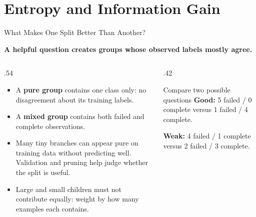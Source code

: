 \documentclass[aspectratio=169,10pt]{beamer}
\newcommand{\conceptlead}[1]{%
  {\normalsize\bfseries\color{CalPolyGreen}#1\par}%
}
\begin{document}
\section{Entropy and Information Gain}

\begin{frame}{What Makes One Split Better Than Another?}
\small
\conceptlead{A helpful question creates groups whose observed labels mostly agree.}
\begin{columns}[T,onlytextwidth]
 \begin{column}{.54\textwidth}
  \begin{itemize}
   \item A \textbf{pure group} contains one class only: no disagreement about its training labels.
   \item A \textbf{mixed group} contains both failed and complete observations.
   \item Many tiny branches can appear pure on training data without predicting well. Validation and pruning help judge whether the split is useful.
   \item Large and small children must not contribute equally: weight by how many examples each contains.
  \end{itemize}
 \end{column}
 \begin{column}{.42\textwidth}
  \begin{block}{Compare two possible questions}
  \textbf{Good:} 5 failed / 0 complete versus 1 failed / 4 complete.\par\medskip
  \textbf{Weak:} 4 failed / 1 complete versus 2 failed / 3 complete.
  \end{block}
 \end{column}
\end{columns}
\end{frame}
\end{document}
